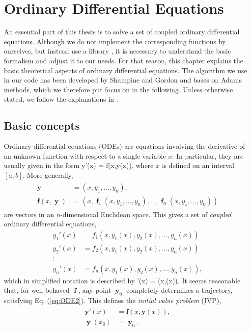 \chapter{Ordinary Differential Equations}
An essential part of this thesis is to solve a set of coupled ordinary differential equations. Although we do not implement the corresponding functions by ourselves, but instead use a library \cite{odesolver}, it is necessary to understand the basic formalism and  adjust it to our needs. For that reason, this chapter explains the basic theoretical aspects of ordinary differential equations. The algorithm we use in our code has been developed by Shampine and Gordon \cite{shampine1975computer} and bases on Adams methods, which we therefore put focus on in the following. Unless otherwise stated, we follow the explanations in \cite{1377857,hairer2011solving}.

\section{Basic concepts}
Ordinary differential equations (ODEs) are equations involving the derivative of an unknown function with respect to a single variable $x$. In particular, they are usually given in the form
\be 
y'(x) = f(x,y(x)),
\ee
where $x$ is defined on an interval $[a,b]$. More generally,
\begin{align}
\begin{split}
\mathbf{y} &= (x,y_1,\dots,y_n), \\
\mathbf{f}(x,\mbfy) &= (x,\mbff_1(x,y_1,\dots,y_n),\dots,\mbff_n(x,y_1,\dots,y_n))
\end{split}
\end{align}
 are vectors in an $n$-dimensional Euclidean space. This gives a set of \textit{coupled} ordinary differential equations,
\begin{align*}
y_1'(x) &= f_1(x,y_1(x),y_2(x),\dots, y_n(x))\\
y_2'(x) &= f_2(x,y_1(x),y_2(x),\dots, y_n(x))\\
\vdots& \\
y_n'(x) &= f_n(x,y_1(x),y_2(x),\dots, y_n(x)),
\end{align*}
which in simplified notation is described by
\be 
{}'(x) = (x,(x)).
\label{eq:ODE2}
\ee
It seems reasonable that, for well-behaved $\mbff$, any point $\mbfy_0$ completely determines a trajectory, satisfying Eq. (\ref{eq:ODE2}). This defines the \textit{initial value problem} (IVP),
\begin{align}
\begin{split}
\mathbf{y}'(x) &= \mathbf{f}(x,\mathbf{y}(x)),\\
\mbfy(x_0) &= \mbfy_0.
\label{eq:IVP}
\end{split}
\end{align}


